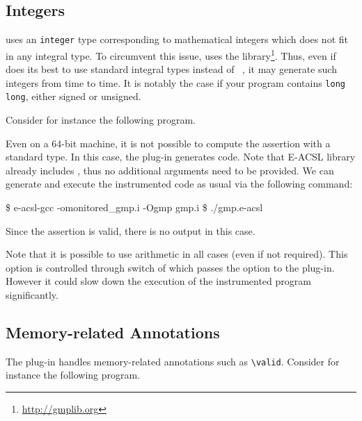 
\subsection{Integers}
\label{sec:integers}

\eacsl uses an \texttt{integer} type corresponding to
mathematical integers which does not fit in any integral \C type. To circumvent
this issue, \eacsl uses the \gmp library\footnote{\url{http://gmplib.org}}.
Thus, even if \eacsl does its best to use standard integral types instead of
\gmp~\cite{kosmatov20rv}, it may generate such integers from time to time. It is
notably the case if your program contains \lstinline|long long|, either signed
or unsigned.

Consider for instance the following program.


Even on a 64-bit machine, it is not possible to compute the assertion with a
standard \C type. In this case, the \eacsl plug-in generates \gmp code.  Note
that E-ACSL library already includes \gmp, thus no additional arguments need to
be provided.  We can generate and execute the instrumented code as usual via
the following command:

\begin{shell}
\$ e-acsl-gcc -omonitored_gmp.i -Ogmp gmp.i
\$ ./gmp.e-acsl
\end{shell}

Since the assertion is valid, there is no output in this case.

Note that it is possible to use \gmp arithmetic in all cases (even if not
required). This option is controlled through  switch of \eacslgcc
which passes the  option to the \eacsl
plug-in. However it could slow down the execution of the instrumented program
significantly.


\subsection{Memory-related Annotations}
\label{sec:memory}

The \eacsl plug-in handles memory-related annotations such as
\lstinline|\valid|.  Consider for instance the following program.

